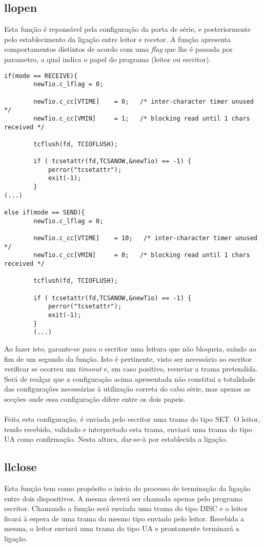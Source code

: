 \documentclass{article}
\begin{document}
\subsection{llopen}

Esta função é reponsável pela configuração da porta de série, e posteriormente pelo establecimento da ligação entre leitor e recetor. A função apresenta comportamentos distintos de acordo com uma \textit{flag} que lhe é passada por parametro, a qual indica o papel do programa (leitor ou escritor).\\

\begin{lstlisting}
if(mode == RECEIVE){
		newTio.c_lflag = 0;

		newTio.c_cc[VTIME]    = 0;   /* inter-character timer unused */
		newTio.c_cc[VMIN]     = 1;   /* blocking read until 1 chars received */

		tcflush(fd, TCIOFLUSH);

		if ( tcsetattr(fd,TCSANOW,&newTio) == -1) {
			perror("tcsetattr");
			exit(-1);
		}
(...)

else if(mode == SEND){
		newTio.c_lflag = 0;

		newTio.c_cc[VTIME]    = 10;   /* inter-character timer unused */
		newTio.c_cc[VMIN]     = 0;   /* blocking read until 1 chars received */

		tcflush(fd, TCIOFLUSH);

		if ( tcsetattr(fd,TCSANOW,&newTio) == -1) {
			perror("tcsetattr");
			exit(-1);
		}
		(...)

\end{lstlisting}

Ao fazer isto, garante-se para o escritor uma leitura que não bloqueia, saíndo ao fim de um segundo da função. Isto é pertinente, visto ser necessário ao escritor verificar se ocorreu um \textit{timeout} e, em caso positivo, reenviar a trama pretendida. Será de realçar que a configuração acima apresentada não constitui a totalidade das configurações necessárias à utilização correta do cabo série, mas apenas as secções onde essa configuração difere entre os dois papeis.\\\\

Feita esta configuração, é enviada pelo escritor uma trama do tipo SET. O leitor, tendo recebido, validado e interpretado esta trama, enviará uma trama do tipo UA como confirmação. Nesta altura, dar-se-à por establecida a ligação.

\subsection{llclose}
Esta função tem como propósito o início do processo de terminação da ligação entre dois dispositivos. A mesma deverá ser chamada apenas pelo programa escritor. Chamando a função será enviada uma trama do tipo DISC e o leitor ficará à espera de uma trama do mesmo tipo enviado pelo leitor. Recebida a mesma, o leitor enviará uma trama do tipo UA e prontamente terminará a ligação.
\end{document}
